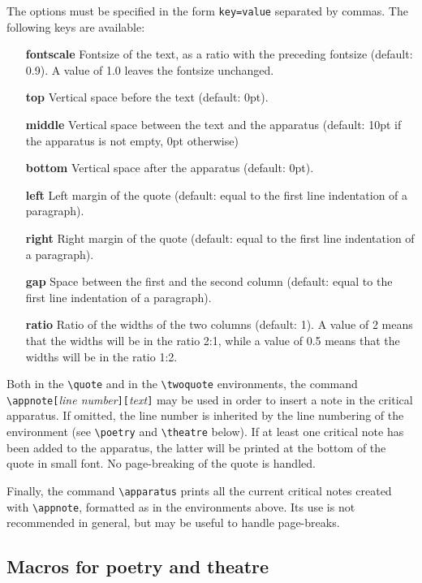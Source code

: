 \documentclass[11pt,a4paper]{article}
\begin{document}
	The options must be specified in the form \verb|key=value| separated by commas. The following keys are available:
	\begin{itemize}
		\item[\textbf{fontscale}] Fontsize of the text, as a ratio with the preceding fontsize (default: 0.9). A value of 1.0 leaves the fontsize  unchanged.
		\item[\textbf{top}] Vertical space before the text (default: 0pt).
		\item[\textbf{middle}] Vertical space between the text and the apparatus (default: 10pt if the apparatus is not empty, 0pt otherwise)
		\item[\textbf{bottom}] Vertical space after the apparatus (default: 0pt).
		\item[\textbf{left}] Left margin of the quote (default: equal to the first line indentation of a paragraph).
		\item[\textbf{right}] Right margin of the quote (default: equal to the first line indentation of a paragraph).
		\item[\textbf{gap}] Space between the first and the second column (default: equal to the first line indentation of a paragraph).
		\item[\textbf{ratio}] Ratio of the widths of the two columns (default: 1). A value of 2 means that the widths will be in the ratio 2:1, while a value of 0.5 means that the widths will be in the ratio 1:2.
	\end{itemize}

  Both in the \verb|\quote| and in the \verb|\twoquote| environments, the command \verb|\appnote[|\emph{line number}\verb|][|\emph{text}\verb|]| may be used in order to insert a note in the critical apparatus. If omitted, the line number is inherited by the line numbering of the environment (see \verb|\poetry| and \verb|\theatre| below). If at least one critical note has been added to the apparatus, the latter will be printed at the bottom of the quote in small font. No page-breaking of the quote is handled.
	
	Finally, the command \verb|\apparatus| prints all the current critical notes created with \verb|\appnote|, formatted as in the environments above. Its use is not recommended in general, but may be useful to handle page-breaks.
	
	\subsection{Macros for poetry and theatre}
	
\end{document}
